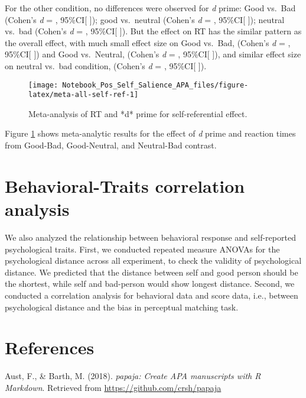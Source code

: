 \documentclass[man]{apa6}
\begin{document}
For the other condition, no differences were observed for \emph{d} prime: Good vs.~Bad (Cohen's \emph{d} = , 95\%CI{[} {]}); good vs.~neutral (Cohen's \emph{d} = , 95\%CI{[} {]}); neutral vs.~bad (Cohen's \emph{d} = , 95\%CI{[} {]}). But the effect on RT has the similar pattern as the overall effect, with much small effect size on Good vs.~Bad, (Cohen's \emph{d} = , 95\%CI{[} {]}) and Good vs.~Neutral, (Cohen's \emph{d} = , 95\%CI{[} {]}), and similar effect size on neutral vs.~bad condition, (Cohen's \emph{d} = , 95\%CI{[} {]}).

\begin{figure}

{\centering \texttt{[image: Notebook\_Pos\_Self\_Salience\_APA\_files/figure-latex/meta-all-self-ref-1]} 

}

\caption{Meta-analysis of RT and *d* prime for self-referential effect.}\label{fig:meta-all-self-ref}
\end{figure}

Figure \ref{fig:meta-all-self-ref} shows meta-analytic results for the effect of \emph{d} prime and reaction times from Good-Bad, Good-Neutral, and Neutral-Bad contrast.

\hypertarget{behavioral-traits-correlation-analysis}{%
\section{Behavioral-Traits correlation analysis}\label{behavioral-traits-correlation-analysis}}

We also analyzed the relationship between behavioral response and self-reported psychological traits. First, we conducted repeated measure ANOVAs for the psychological distance across all experiment, to check the validity of psychological distance. We predicted that the distance between self and good person should be the shortest, while self and bad-person would show longest distance. Second, we conducted a correlation analysis for behavioral data and score data, i.e., between psychological distance and the bias in perceptual matching task.

\hypertarget{references}{%
\section{References}\label{references}}

\begingroup
\setlength{\parindent}{-0.5in}
\setlength{\leftskip}{0.5in}

\hypertarget{refs}{}
\leavevmode\hypertarget{ref-R-papaja}{}%
Aust, F., \& Barth, M. (2018). \emph{papaja: Create APA manuscripts with R Markdown}. Retrieved from \url{https://github.com/crsh/papaja}
\end{document}
